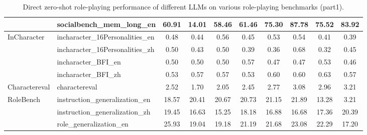 \begin{table*}[ht]
{\begin{tabular}{llcccccccc}
 & socialbench\_mem\_long\_en & 60.91 & 14.01 & 58.46 & 61.46 & 75.30 & 87.78 & 75.52 & 83.92 \\
 \midrule
\multirow{4}{*}{InCharacter} & incharacter\_16Personalities\_en & 0.48 & 0.44 & 0.56 & 0.45 & 0.53 & 0.54 & 0.41 & 0.39 \\
 & incharacter\_16Personalities\_zh & 0.50 & 0.43 & 0.50 & 0.39 & 0.36 & 0.68 & 0.32 & 0.45 \\
 & incharacter\_BFI\_en & 0.50 & 0.50 & 0.50 & 0.57 & 0.47 & 0.47 & 0.53 & 0.46 \\
 & incharacter\_BFI\_zh & 0.53 & 0.57 & 0.57 & 0.53 & 0.60 & 0.60 & 0.63 & 0.57 \\
 \midrule
 Charactereval & charactereval & 2.52 & 1.70 & 2.05 & 2.45 & 2.77 & 3.08 & 2.96 & 3.21   \\
  \midrule
\multirow{3}{*}{RoleBench} & instruction\_generalization\_en & 18.57 & 20.41 & 20.67 & 20.73 & 21.15 & 21.89 & 13.28 & 3.21 \\
 & instruction\_generalization\_zh & 19.45 & 16.63 & 15.25 & 18.18 & 16.88 & 16.68 & 17.36 & 20.39 \\
 & role\_generalization\_en & 25.93 & 19.04 & 19.18 & 21.19 & 21.68 & 23.08 & 22.29 & 17.20 \\
\bottomrule
\end{tabular}%
}
\caption{Direct zero-shot role-playing performance of different LLMs on various role-playing benchmarks (part1).}
\label{tab:zero_shot_performance_part_1}
\end{table*}


